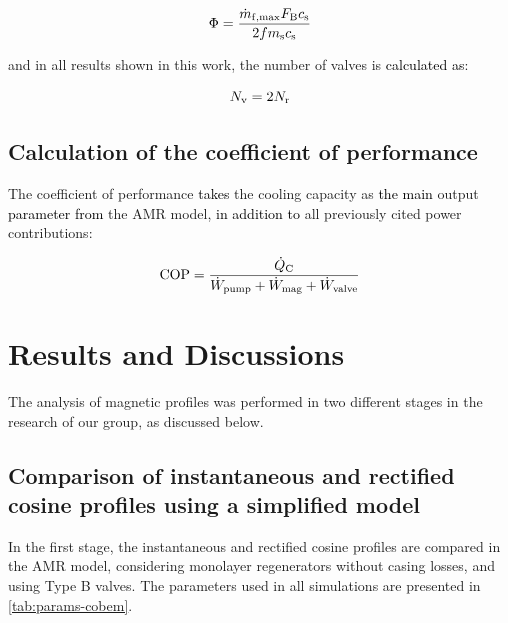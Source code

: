 \documentclass[referee]{svjour3}
\begin{document}
\begin{equation}
  \label{eq:110}
  \Phi = \frac{\dot{m}_{\mathrm{f,max}} F_{\mathrm{B}} c_{\mathrm{s}}}{2 f m_{\mathrm{s}} c_{\mathrm{s}}}
\end{equation}

\noindent and in all results shown in this work, the number of valves is \textcolor{black}{calculated as}:

\begin{equation}
  \label{eq:111}
  N_{\mathrm{v}} = 2 N_{\mathrm{r}}
\end{equation}

\subsection{Calculation of the coefficient of performance}
\label{sec:calc-coeff-perf}

The coefficient of performance \textcolor{black}{takes} the cooling capacity as \textcolor{black}{the main} output \textcolor{black}{parameter from} the AMR model, \textcolor{black}{in addition to} all previously cited power contributions:

\begin{equation}
  \label{eq:112}
  \mathrm{COP} = \frac{\dot{Q}_{\mathrm{C}}}{\dot{W}_{\mathrm{pump}} + \dot{W}_{\mathrm{mag}} + \dot{W}_{\mathrm{valve}}}
\end{equation}



\section{Results and Discussions}
\label{sec:results-discussions}

The analysis of magnetic profiles was performed in two different stages in the research of our group, as discussed below.

\subsection{Comparison of instantaneous and rectified cosine profiles using a simplified model}
\label{sec:comp-cosine-inst}

In the first stage, the instantaneous and rectified cosine profiles are compared in the AMR model, considering monolayer regenerators without casing losses, and using Type B valves. The parameters used in all simulations are presented in \autoref{tab:params-cobem}.
\end{document}
